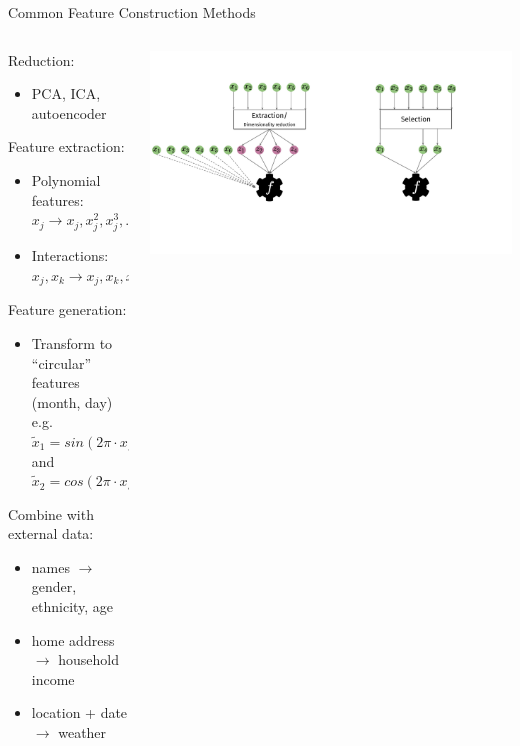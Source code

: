 \begin{frame}{Common Feature Construction Methods}
  \begin{columns}
    \begin{column}{0.6\textwidth}
    Reduction:
    \begin{itemize}
      \item PCA, ICA, autoencoder
    \end{itemize}

    Feature extraction:
    \begin{itemize}
      \item Polynomial features: $x_j \longrightarrow x_j, x_j^2, x_j^3, ...$
      \item Interactions: $x_j, x_k \longrightarrow x_j, x_k, x_j \cdot x_k$
    \end{itemize}

    Feature generation:
    \begin{itemize}
      \item Transform to ``circular'' features (month, day) \\
      e.g.\ $\tilde x_1 = sin(2\pi \cdot x /24)$ and $\tilde x_2 = cos(2\pi \cdot x /24)$
    \end{itemize}
    
    Combine with external data:
    \begin{itemize}
      \item names $\longrightarrow$ gender, ethnicity, age
      \item home address $\longrightarrow$ household income
      \item location + date $\longrightarrow$ weather
    \end{itemize}

    \end{column}%
    \begin{column}{0.4\textwidth}
      \begin{center}
        \includegraphics[width= \textwidth, trim=0 100 390 60, clip]{images/feat_extr_vs_selection.pdf}
      \end{center}
    \end{column}
  \end{columns}
    
\end{frame}


